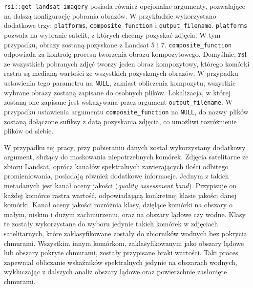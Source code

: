 \documentclass{amuthesis}
\begin{document}
\texttt{rsi::get\_landsat\_imagery} posiada również opcjonalne
argumenty, pozwalające na dalszą konfigurację pobrania obrazów. W
przykładzie wykorzystano dodatkowe trzy: \texttt{platforms},
\texttt{composite\_function} i \texttt{output\_filename}.
\texttt{platforms} pozwala na wybranie satelit, z których chcemy
pozyskać zdjęcia. W tym przypadku, obrazy zostaną pozyskane z Landsat 5
i 7. \texttt{composite\_function} odpowiada za kontrolę procesu
tworzenia obrazu kompozytowego. Domyślnie, \textbf{rsi} ze wszystkich
pobranych zdjęć tworzy jeden obraz kompozytowy, którego komórki rastra
są medianą wartości ze wszystkich pozyskanych obrazów. W przypadku
ustawienia tego parametru na \texttt{NULL}, zamiast obliczenia
kompozytu, wszystkie wybrane obrazy zostaną zapisane do osobnych plików.
Lokalizacja, w której zostaną one zapisane jest wskazywana przez
argument \texttt{output\_filename}. W przypadku ustawienia argumentu
\texttt{composite\_function} na \texttt{NULL}, do nazwy plików zostaną
dołączone sufiksy z datą pozyskania zdjęcia, co umożliwi rozróżnienie
plików od siebie.

W przypadku tej pracy, przy pobieraniu danych został wykorzystany
dodatkowy argument, służący do maskowania niepotrzebnych komórek.
Zdjęcia satelitarne ze zbioru Landsat, oprócz kanałów spektralnych
zawierających ilości odbitego promieniowania, posiadają również
dodatkowe informacje. Jednym z takich metadanych jest kanał oceny
jakości (\emph{quality assessment band}). Przypisuje on każdej komórce
rastra wartość, odpowiadającą konkretnej klasie jakości danej komórki.
Kanał oceny jakości rozróżnia klasy, dzięlące komórki na obszary o
małym, niskim i dużym zachmurzeniu, oraz na obszary lądowe czy wodne.
Klasy te zostały wykorzystane do wyboru jedynie takich komórek w
zdjęciach satelitarnych, które zaklasyfikowane zostały do zbiorników
wodnych bez pokrycia chmurami. Wszystkim innym komórkom,
zaklasyfikowanym jako obszary lądowe lub obszary pokryte chmurami,
zostały przypisane braki wartości. Taki proces zapewniał obliczanie
wskaźników spektralnych jedynie na obszarach wodnych, wykluczając z
dalszych analiz obszary lądowe oraz powierzchnie zasłonięte chmurami.
\end{document}
